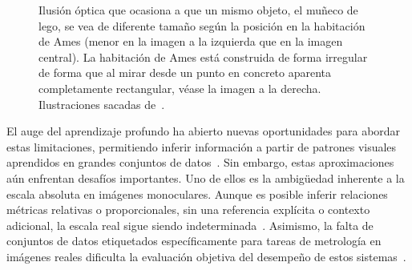 \begin{figure}[!ht]
\begin{center}
\end{center}
\caption{Ilusión óptica que ocasiona a que un mismo objeto, el muñeco de lego, se vea de diferente tamaño según la posición en la habitación
de Ames (menor en la imagen a la izquierda que en la imagen central). La habitación de Ames está construida de forma irregular de forma que al mirar desde un punto en concreto aparenta completamente rectangular, véase la imagen a la derecha.
Ilustraciones sacadas de~\cite{VisionBookMIT}.
}\label{fig:PerspectiveIlusion}
\end{figure}

El auge del aprendizaje profundo ha abierto nuevas oportunidades para abordar estas limitaciones, permitiendo inferir información a 
partir de patrones visuales aprendidos en grandes conjuntos de datos~\cite{PascalVisualObjectChallenge, ImageNet, EffectivenessOfData}. Sin embargo, estas aproximaciones
aún enfrentan desafíos importantes. Uno de ellos es la ambigüedad inherente a la escala absoluta en imágenes monoculares.
Aunque es posible inferir relaciones métricas relativas o proporcionales, sin una referencia explícita o contexto adicional, 
la escala real sigue siendo indeterminada~\cite{DepthFromSingleImage}. Asimismo, la falta de conjuntos de datos etiquetados específicamente para 
tareas de metrología en imágenes reales dificulta la evaluación objetiva del desempeño de estos sistemas~\cite{SVMIW,Metric3Dv2,}.

